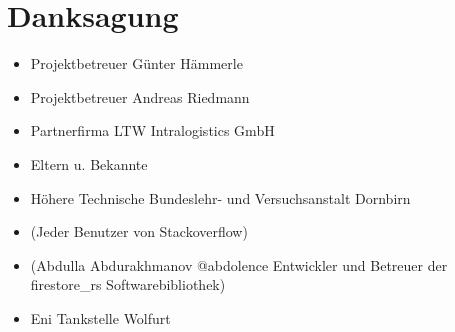 \section*{Danksagung}

\begin{itemize}
  \item Projektbetreuer Günter Hämmerle
  \item Projektbetreuer Andreas Riedmann
  \item Partnerfirma LTW Intralogistics GmbH
  \item Eltern u. Bekannte
  \item Höhere Technische Bundeslehr- und Versuchsanstalt Dornbirn
  \item (Jeder Benutzer von Stackoverflow)
  \item (Abdulla Abdurakhmanov @abdolence Entwickler und Betreuer der firestore\_rs Softwarebibliothek)
  \item Eni Tankstelle Wolfurt
\end{itemize}